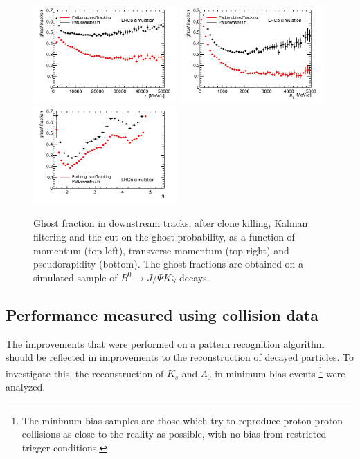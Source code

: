 \begin{figure}[tbph]
\begin{center}
\includegraphics[width = 0.49\textwidth]{figures/EffPatLLT/compare/BJpsiKSGhostFracP_TBTC.png} 
\includegraphics[width = 0.49\textwidth]{figures/EffPatLLT/compare/BJpsiKSGhostFracPt_TBTC.png}
\includegraphics[width = 0.49\textwidth]{figures/EffPatLLT/compare/BJpsiKSGhostFracEta_TBTC.png} 
\caption{Ghost fraction in downstream tracks, after clone killing, Kalman filtering and the cut on the ghost probability, as a function of momentum (top left), transverse momentum (top right) and pseudorapidity (bottom). The ghost fractions are obtained on a simulated sample of  $B^{0} \rightarrow J/\Psi K^{0}_{S}$ decays.}
\label{fig:ghostCompPatLLTBJpsiK_TBTC}
 \end{center}
 \end{figure}

\subsection{Performance measured using collision data}
\label{sec:performance_data}
The improvements that were performed on a pattern recognition algorithm should be reflected in improvements to the reconstruction of decayed particles. To investigate this, the reconstruction of $K_s$ and $\Lambda_0$ in minimum bias events \footnote{The minimum bias samples are those which try to reproduce proton-proton collisions as close to the reality as possible, with no bias from restricted trigger conditions.} were analyzed. 

